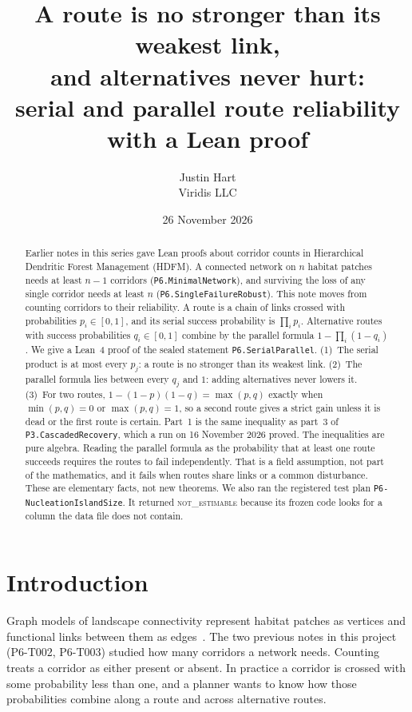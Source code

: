 \documentclass[11pt]{article}
\title{A route is no stronger than its weakest link,\\ and alternatives never hurt:\\ serial and parallel route reliability with a Lean proof}
\author{Justin Hart\\Viridis LLC}
\date{26 November 2026}
\begin{document}
\maketitle

\begin{abstract}
Earlier notes in this series gave Lean proofs about corridor counts in Hierarchical Dendritic Forest
Management (HDFM). A connected network on $n$ habitat patches needs at least $n-1$ corridors
(\texttt{P6.MinimalNetwork}), and surviving the loss of any single corridor needs at least $n$
(\texttt{P6.SingleFailureRobust}). This note moves from counting corridors to their reliability. A route
is a chain of links crossed with probabilities $p_i\in[0,1]$, and its serial success probability is
$\prod_i p_i$. Alternative routes with success probabilities $q_i\in[0,1]$ combine by the parallel
formula $1-\prod_i(1-q_i)$. We give a Lean~4 proof of the sealed statement \texttt{P6.SerialParallel}.
(1)~The serial product is at most every $p_j$: a route is no stronger than its weakest link.
(2)~The parallel formula lies between every $q_j$ and $1$: adding alternatives never lowers it.
(3)~For two routes, $1-(1-p)(1-q)=\max(p,q)$ exactly when $\min(p,q)=0$ or $\max(p,q)=1$, so a second
route gives a strict gain unless it is dead or the first route is certain. Part~1 is the same inequality
as part~3 of \texttt{P3.CascadedRecovery}, which a run on 16 November 2026 proved. The inequalities are
pure algebra. Reading the parallel formula as the probability that at least one route succeeds requires
the routes to fail independently. That is a field assumption, not part of the mathematics, and it fails
when routes share links or a common disturbance. These are elementary facts, not new theorems. We also
ran the registered test plan \texttt{P6-NucleationIslandSize}. It returned \textsc{not\_estimable}
because its frozen code looks for a column the data file does not contain.
\end{abstract}

\section{Introduction}
Graph models of landscape connectivity represent habitat patches as vertices and functional links
between them as edges~\citep{urbankeitt2001}. The two previous notes in this project (P6-T002, P6-T003)
studied how many corridors a network needs. Counting treats a corridor as either present or absent. In
practice a corridor is crossed with some probability less than one, and a planner wants to know how
those probabilities combine along a route and across alternative routes.
\end{document}
